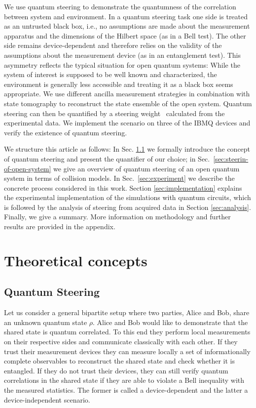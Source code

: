 \documentclass[aps,pra,twocolumn,superscriptaddress,showemail,showpacs,longbibliography]{revtex4-2}
\begin{document}
We use quantum steering to demonstrate the quantumness of the correlation between system and environment. In a quantum steering task one side is treated as an untrusted black box, i.e., no assumptions are made about the measurement apparatus and the dimensions of the Hilbert space (as in a Bell test). The other side remains device-dependent and therefore relies on the validity of the assumptions about the measurement device (as in an entanglement test). This asymmetry reflects the typical situation for open quantum systems: While the system of interest is supposed to be well known and characterized, the environment is generally less accessible and treating it as a black box seems appropriate. We use different ancilla measurement strategies in combination with state tomography to reconstruct the state ensemble of the open system. Quantum steering can then be quantified by a steering weight~\cite{SkrzypczykQuantifying-Einstein-Podolsky-Rosen-Steering2014,cavalcantiQuantumSteeringReview2017} calculated from the experimental data. We implement the scenario on three of the IBMQ devices and verify the existence of quantum steering.

We structure this article as follows: In Sec. \ref{sec:steering} we formally introduce the concept of quantum steering and present the quantifier of our choice; in Sec.~\ref{sec:steerin-of-open-system} we give an overview of quantum steering of an open quantum system in terms of collision models. In Sec.~\ref{sec:experiment} we describe the concrete process considered in this work. Section \ref{sec:implementation} explains the experimental implementation of the simulations with quantum circuits, which is followed by the analysis of steering from acquired data in Section \ref{sec:analysis}. Finally, we give a summary. More information on methodology and further results are provided in the appendix.


\section{Theoretical concepts}

\subsection{Quantum Steering}
\label{sec:steering}
Let us consider a general bipartite setup where two parties, Alice and Bob, share an unknown quantum state $\rho$. Alice and Bob would like to demonstrate that the shared state is quantum correlated. To this end they perform local measurements on their respective sides and communicate classically with each other. If they trust their measurement devices they can measure locally a set of informationally complete observables to reconstruct the shared state and check whether it is entangled. If they do not trust their devices, they can still verify quantum correlations in the shared state if they are able to violate a Bell inequality with the measured statistics. The former is called a device-dependent and the latter a device-independent scenario.
\end{document}
